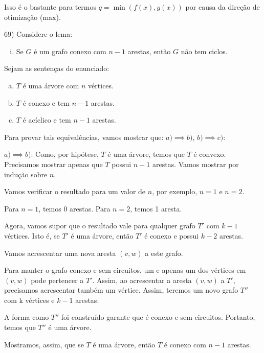 \documentclass[]{article}
\begin{document}
Isso é o bastante para termos $q = \min(f(x), g(x))$ por causa da direção de otimização (max).

\vspace{0.5cm}

69) Considere o lema:

\begin{enumerate}[i)]
    \item Se $G$ é um grafo conexo com $n-1$ arestas, então $G$ não tem ciclos.
\end{enumerate}

Sejam as sentenças do enunciado:

\begin{enumerate}[a)]
    \item $T$ é uma árvore com $n$ vértices.
    \item $T$ é conexo e tem $n - 1$ arestas.
    \item $T$ é acíclico e tem $n - 1$ arestas.
\end{enumerate}

Para provar tais equivalências, vamos mostrar que: $a) \implies b)$, $b) \implies c)$:

\vspace{0.5cm}

$a) \implies b)$: Como, por hipótese, $T$ é uma árvore, temos que $T$ é convexo. Precisamos mostrar apenas que $T$ possui $n - 1$ arestas. Vamos mostrar por indução sobre $n$.

Vamos verificar o resultado para um valor de $n$, por exemplo, $n = 1$ e $n = 2$.

Para $n = 1$, temos 0 arestas.
Para $n = 2$, temos 1 aresta.

Agora, vamos supor que o resultado vale para qualquer grafo $T'$ com $k - 1$ vértices. Isto é, se $T'$ é uma árvore, então $T'$ é conexo e possui $k - 2$ arestas.

Vamos acrescentar uma nova aresta $(v, w)$ a este grafo. 

Para manter o grafo conexo e sem circuitos, um e apenas um dos vértices em $(v, w)$ pode pertencer a $T'$. Assim, ao acrescentar a aresta $(v, w)$ a $T'$, precisamos acrescentar também um vértice. Assim, teremos um novo grafo $T''$ com k vértices e $k - 1$ arestas.

A forma como $T''$ foi construído garante que é conexo e sem circuitos. Portanto, temos que $T''$ é uma árvore.

Mostramos, assim, que se $T$ é uma árvore, então $T$ é conexo com $n - 1$ arestas.
\end{document}
